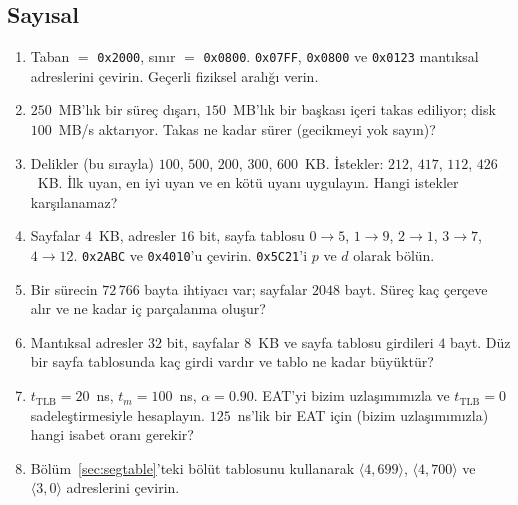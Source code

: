 \subsection*{Sayısal}
\begin{enumerate}[leftmargin=1.6em,resume]
  \item Taban $=$ \texttt{0x2000}, sınır $=$ \texttt{0x0800}. \texttt{0x07FF}, \texttt{0x0800} ve \texttt{0x0123} mantıksal adreslerini çevirin. Geçerli fiziksel aralığı verin.
  \item $250$~MB'lık bir süreç dışarı, $150$~MB'lık bir başkası içeri takas ediliyor; disk $100$~MB/s aktarıyor. Takas ne kadar sürer (gecikmeyi yok sayın)?
  \item Delikler (bu sırayla) $100$, $500$, $200$, $300$, $600$~KB. İstekler: $212$, $417$, $112$, $426$~KB. İlk uyan, en iyi uyan ve en kötü uyanı uygulayın. Hangi istekler karşılanamaz?
  \item Sayfalar $4$~KB, adresler $16$ bit, sayfa tablosu $0\to5$, $1\to9$, $2\to1$, $3\to7$, $4\to12$. \texttt{0x2ABC} ve \texttt{0x4010}'u çevirin. \texttt{0x5C21}'i $p$ ve $d$ olarak bölün.
  \item Bir sürecin $72\,766$ bayta ihtiyacı var; sayfalar $2048$ bayt. Süreç kaç çerçeve alır ve ne kadar iç parçalanma oluşur?
  \item Mantıksal adresler $32$ bit, sayfalar $8$~KB ve sayfa tablosu girdileri $4$ bayt. Düz bir sayfa tablosunda kaç girdi vardır ve tablo ne kadar büyüktür?
  \item $t_{\text{TLB}} = 20$~ns, $t_{m} = 100$~ns, $\alpha = 0.90$. EAT'yi bizim uzlaşımımızla ve $t_{\text{TLB}} = 0$ sadeleştirmesiyle hesaplayın. $125$~ns'lik bir EAT için (bizim uzlaşımımızla) hangi isabet oranı gerekir?
  \item Bölüm~\ref{sec:segtable}'teki bölüt tablosunu kullanarak $\langle 4, 699\rangle$, $\langle 4, 700\rangle$ ve $\langle 3, 0\rangle$ adreslerini çevirin.
\end{enumerate}


